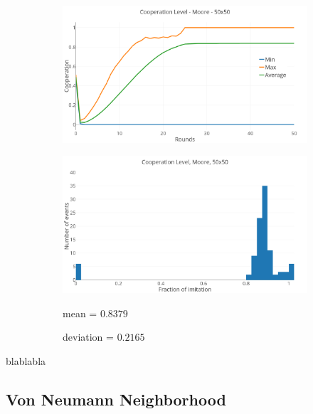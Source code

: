 \documentclass[a4paper, 11pt]{article}
\begin{document}
\begin{figure}[H]
\begin{subfigure}{.75\textwidth}
	\includegraphics[width=1\linewidth]{PDMoore50x50}
\end{subfigure}

\begin{subfigure}{.75\textwidth}
	\includegraphics[width=1\linewidth]{PDMoore50x50HG}
\end{subfigure}%
\begin{subfigure}{.25\textwidth}
	mean = $0.8379$
	
	deviation = $0.2165$
\end{subfigure}

\end{figure}

blablabla


\newpage

\subsection{Von Neumann Neighborhood}
\end{document}
